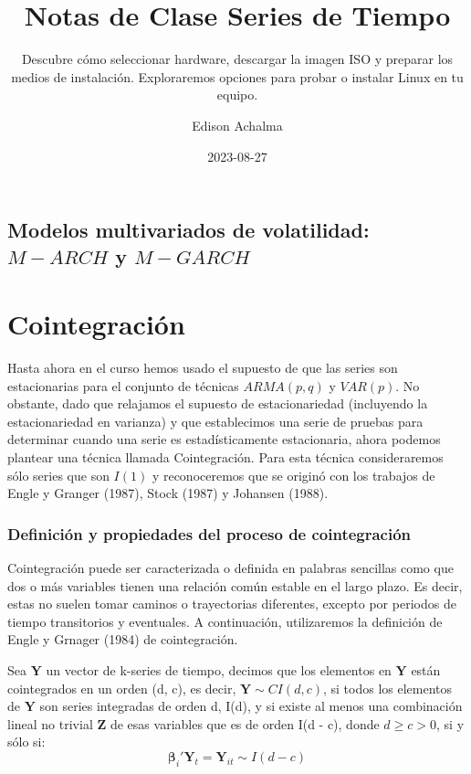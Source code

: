 \documentclass[
  a4paper,
]{article}
\title{Notas de Clase Series de Tiempo}
\subtitle{Descubre cómo seleccionar hardware, descargar la imagen ISO y
preparar los medios de instalación. Exploraremos opciones para probar o
instalar Linux en tu equipo.}
\author{Edison Achalma}
\date{2023-08-27}
\begin{document}
\maketitle

\section{\texorpdfstring{Modelos multivariados de volatilidad:
\(M - ARCH\) y
\(M - GARCH\)}{Modelos multivariados de volatilidad: M - ARCH y M - GARCH}}\label{modelos-multivariados-de-volatilidad-m---arch-y-m---garch}

\chapter{Cointegración}

Hasta ahora en el curso hemos usado el supuesto de que las series son
estacionarias para el conjunto de técnicas \(ARMA(p,q)\) y \(VAR(p)\).
No obstante, dado que relajamos el supuesto de estacionariedad
(incluyendo la estacionariedad en varianza) y que establecimos una serie
de pruebas para determinar cuando una serie es estadísticamente
estacionaria, ahora podemos plantear una técnica llamada Cointegración.
Para esta técnica consideraremos sólo series que son \(I(1)\) y
reconoceremos que se originó con los trabajos de Engle y Granger (1987),
Stock (1987) y Johansen (1988).

\subsection{Definición y propiedades del proceso de
cointegración}\label{definiciuxf3n-y-propiedades-del-proceso-de-cointegraciuxf3n}

Cointegración puede ser caracterizada o definida en palabras sencillas
como que dos o más variables tienen una relación común estable en el
largo plazo. Es decir, estas no suelen tomar caminos o trayectorias
diferentes, excepto por periodos de tiempo transitorios y eventuales. A
continuación, utilizaremos la definición de Engle y Grnager (1984) de
cointegración.

Sea \(\mathbf{Y}\) un vector de k-series de tiempo, decimos que los
elementos en \(\mathbf{Y}\) están cointegrados en un orden (d, c), es
decir, \(\mathbf{Y} \sim CI(d, c)\), si todos los elementos de
\(\mathbf{Y}\) son series integradas de orden d, I(d), y si existe al
menos una combinación lineal no trivial \(\mathbf{Z}\) de esas variables
que es de orden I(d - c), donde \(d \geq c > 0\), si y sólo si: \[
    \boldsymbol{\beta}_i' \mathbf{Y}_t = \mathbf{Y}_{it} \sim I(d-c)
\]
\end{document}
